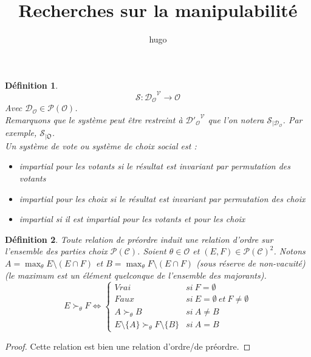 \documentclass[french,11pt,a4paper]{article}
\title{Recherches sur la manipulabilité}
\author{hugo}
\newtheorem{definition}{Définition}
\newcommand{\mc}[1]{\ensuremath{\mathcal{#1}} }  %
\begin{document}
	\maketitle
	
	\begin{definition}
		\begin{equation}
			\mathscr{S} : {\mc{D}_\mc{O}}^\mc{V} \rightarrow \mc{O}
		\end{equation}
		Avec $\mc{D}_\mc{O} \in \mc{P}(\mc{O})$. \\
		Remarquons que le système peut être restreint à ${\mc{D}'_\mc{O}}^\mc{V}$ que l'on notera $\mathscr{S}_{|{\mc{D}_\mc{O}}}$. Par exemple, $\mathscr{S}_{|\mathfrak{O}}$. \\
		Un système de vote ou système de choix social est :
		\begin{itemize}
			\item impartial pour les votants si le résultat est invariant par permutation des votants
			\item impartial pour les choix si le résultat est invariant par permutation des choix
			\item  impartial si il est impartial pour les votants et pour les choix
		\end{itemize}
	\end{definition}
	
	\begin{definition}
		Toute relation de préordre induit une relation d'ordre sur l'ensemble des parties choix $\mathcal{P(C)}$. \newline
		Soient $\theta \in \mc{O}$ et $(E,F) \in \mc{P(C)}^2$. Notons $A = \max_\theta E \!\setminus\! (E \cap F)$ et $B = \max_\theta F \!\setminus\! (E \cap F)$ (sous réserve de non-vacuité) (le maximum est un élément quelconque de l'ensemble des majorants).
		\begin{equation}
			E \succ_\theta F \iff
			\left\{ \begin{matrix}
				Vrai &si \ F = \emptyset \\
				Faux &si \ E = \emptyset \ et \ F \neq \emptyset \\
				A \succ_\theta B &si \ A \neq B \\
				E \!\setminus\! \{A\} \succ_\theta F \!\setminus\! \{B\} &si \ A = B
			\end{matrix} \right.
		\end{equation}
	\end{definition}
	
	\begin{proof}
		Cette relation est bien une relation d'ordre/de préordre.
	\end{proof}
	
\end{document}
